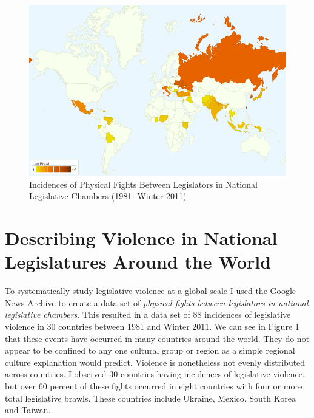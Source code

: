 \documentclass[a4paper]{article}\usepackage{graphicx, color}
\begin{document}
\begin{figure}[h!]
    \centering
    \caption{Incidences of Physical Fights Between Legislators in National Legislative Chambers (1981- Winter 2011)}
    \label{leg_map}
        \includegraphics[width = 13cm]{incidence_map.png}
\end{figure}

\section{Describing Violence in National Legislatures Around the World}

To systematically study legislative violence at a global scale I used the Google News Archive to create a data set of {\emph{physical fights between legislators in national legislative chambers}}. This resulted in a data set of 88 incidences of legislative violence in 30 countries between 1981 and Winter 2011. We can see in Figure \ref{leg_map} that these events have occurred in many countries around the world. They do not appear to be confined to any one cultural group or region as a simple regional culture explanation would predict. Violence is nonetheless not evenly distributed across countries. I observed 30 countries having incidences of legislative violence, but over 60 percent of these fights occurred in eight countries with four or more total legislative brawls. These countries include Ukraine, Mexico, South Korea and Taiwan. 
\end{document}
